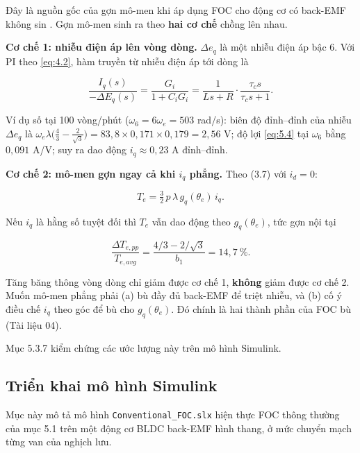 Đây là nguồn gốc của gợn mô-men khi áp dụng FOC cho động cơ có back-EMF không sin \cite{r4}. Gợn mô-men sinh ra theo \textbf{hai cơ chế} chồng lên nhau.

\textbf{Cơ chế 1: nhiễu điện áp lên vòng dòng.} $\Delta e_q$ là một nhiễu điện áp bậc 6. Với PI theo \eqref{eq:4.2}, hàm truyền từ nhiễu điện áp tới dòng là

\begin{equation}
\frac{I_q(s)}{-\Delta E_q(s)} = \frac{G_i}{1 + C_i G_i} = \frac{1}{Ls+R}\cdot\frac{\tau_c s}{\tau_c s + 1}.
\tag{5.4}\label{eq:5.4}
\end{equation}

Ví dụ số tại 100 vòng/phút ($\omega_6 = 6\omega_e = 503$ rad/s): biên độ đỉnh–đỉnh của nhiễu $\Delta e_q$ là $\omega_e\lambda\big(\tfrac43 - \tfrac{2}{\sqrt3}\big) = 83{,}8\times0{,}171\times0{,}179 = 2{,}56$ V; độ lợi \eqref{eq:5.4} tại $\omega_6$ bằng $0{,}091$ A/V; suy ra dao động $i_q \approx 0{,}23$ A đỉnh–đỉnh.

\textbf{Cơ chế 2: mô-men gợn ngay cả khi $i_q$ phẳng.} Theo (3.7) với $i_d = 0$:

\begin{equation}
T_e = \tfrac32\,p\,\lambda\, g_q(\theta_e)\, i_q .
\tag{5.5}\label{eq:5.5}
\end{equation}

Nếu $i_q$ là hằng số tuyệt đối thì $T_e$ vẫn dao động theo $g_q(\theta_e)$, tức gợn nội tại

\begin{equation}
\frac{\Delta T_{e,pp}}{T_{e,avg}} = \frac{4/3 - 2/\sqrt3}{b_1} = 14{,}7\ \%.
\tag{5.6}\label{eq:5.6}
\end{equation}

\begin{ghichu}[Hệ quả]
Tăng băng thông vòng dòng chỉ giảm được cơ chế 1, \textbf{không} giảm được cơ chế 2. Muốn mô-men phẳng phải (a) bù đầy đủ back-EMF để triệt nhiễu, và (b) cố ý điều chế $i_q$ theo góc để bù cho $g_q(\theta_e)$. Đó chính là hai thành phần của FOC bù (Tài liệu 04).
\end{ghichu}

Mục 5.3.7 kiểm chứng các ước lượng này trên mô hình Simulink.

\subsection{Triển khai mô hình Simulink}\label{sec:5.3}

Mục này mô tả mô hình \texttt{Conventional\_FOC.slx} hiện thực FOC thông thường của mục 5.1 trên một động cơ BLDC back-EMF hình thang, ở mức chuyển mạch từng van của nghịch lưu.

